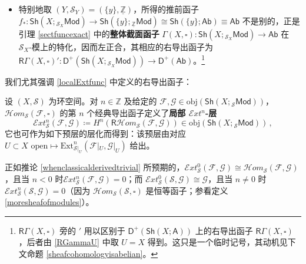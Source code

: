\begin{Rem}
\begin{itemize}[leftmargin=0.5cm]
	\item 特别地取 $(Y,\mathcal{S}_Y)=(\{y\},\underline{\mathbb{Z}})$，所得的推前函子 $f_*:\mathsf{Sh}(X;{}_{\mathcal{S}_X}\!\mathsf{Mod})\rightarrow\mathsf{Sh}(\{y\};{}_{\underline{\mathbb{Z}}}\mathsf{Mod})\cong\mathsf{Sh}(\{y\};\mathsf{Ab})\equiv\mathsf{Ab}$ 不是别的，正是引理 \ref{sectfuncexact} 中的\textbf{整体截面函子} $\Gamma(X,\square):\mathsf{Sh}(X;{}_{\mathcal{S}_X}\!\mathsf{Mod})\rightarrow\mathsf{Ab}$ 在 $\mathcal{S}_X$-模上的特化，因而左正合，其相应的右导出函子为 $\mathsf{R}\Gamma(X,\square)':\mathsf{D^+}(\mathsf{Sh}(X;{}_{\mathcal{S}_X}\!\mathsf{Mod}))\rightarrow \mathsf{D^+}(\mathsf{Ab})$。\footnote{$\mathsf{R}\Gamma(X,\square)$ 旁的 $'$ 用以区别于 $\mathsf{D^+}(\mathsf{Sh}(X;\mathsf{A}))$ 上的右导出函子 $\mathsf{R}\Gamma(X,\square)$，后者由 \eqref{RGammaU} 中取 $U=X$ 得到。这只是一个临时记号，其动机见下文命题 \ref{sheafcohomologyisabelian}。}
\end{itemize} 
\end{Rem}

我们尤其强调 \eqref{localExtfunc} 中定义的右导出函子：

\begin{Def}\label{localExt}
设 $(X,\mathcal{S})$ 为环空间。对 $n\in\mathbb{Z}$ 及给定的 $\mathcal{F},\mathcal{G}\in\text{obj}(\mathsf{Sh}(X;{}_{\mathcal{S}}\mathsf{Mod}))$，$\mathcal{H}om_{\mathcal{S}}(\mathcal{F},\square)$ 的第 $n$ 个经典导出函子定义了\textbf{局部 $\mathcal{E}xt^n$-层} 
\begin{equation}
	\mathcal{E}xt_{\mathcal{S}}^n(\mathcal{F},\mathcal{G})\coloneqq H^n(\mathsf{R}\mathcal{H}om_{\mathcal{S}}(\mathcal{F},\mathcal{G}))\in\text{obj}(\mathsf{Sh}(X;{}_{\mathcal{S}}\mathsf{Mod}))\,,
\end{equation} 
它也可作为如下预层的层化而得到：该预层由对应 $U\subset X\text{ open}\mapsto \text{Ext}_{\mathcal{S}|_U}^n(\mathcal{F}|_U,\mathcal{G}|_U)$ 给出。

正如推论 \ref{whenclassicalderivedtrivial} 所预期的，$\mathcal{E}xt_{\mathcal{S}}^0(\mathcal{F},\mathcal{G})\cong \mathcal{H}om_{\mathcal{S}}(\mathcal{F},\mathcal{G})$，且当 $n<0$ 时\break $\mathcal{E}xt_{\mathcal{S}}^n(\mathcal{F},\mathcal{G})=0$；而 $\mathcal{E}xt_{\mathcal{S}}^0(\mathcal{S},\mathcal{G})\cong \mathcal{G} $，且当 $n\neq 0$ 时 $\mathcal{E}xt_{\mathcal{S}}^n(\mathcal{S},\mathcal{G})=0$（因为 $\mathcal{H}om_{\mathcal{S}}(\mathcal{S},\square)$ 是恒等函子；参看定义 \ref{moresheafofmodules}）。
\end{Def}

